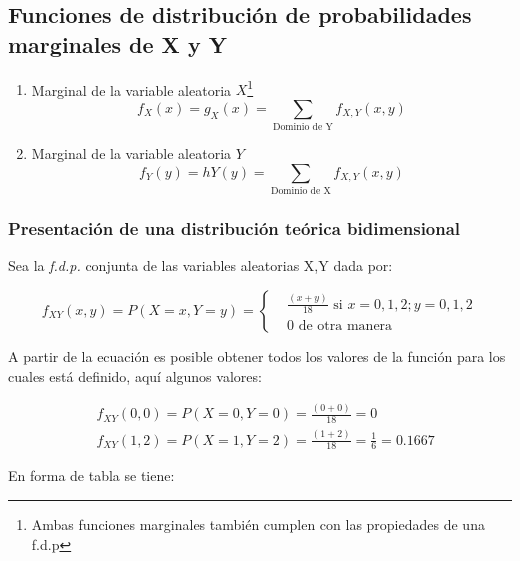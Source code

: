 \subsection{Funciones de distribución de probabilidades marginales de X y Y}

\begin{enumerate}
    \item Marginal de la variable aleatoria $X$\footnote{Ambas funciones marginales también cumplen con las propiedades de una f.d.p}
          \begin{equation}
              f_X\left(x\right) =g_X \left(x\right) = \sum_{\text{Dominio de Y}} f_{X ,Y} \left( x , y \right)
          \end{equation}
    \item Marginal de la variable aleatoria $Y$
          \begin{equation}
              f_Y\left(y\right)=hY\left(y\right)=\sum_{\text{Dominio de X}}f_{X,Y}
              \left(x,y\right)
          \end{equation}
\end{enumerate}

\subsubsection{Presentación de una distribución teórica bidimensional}

Sea la \textit{f.d.p.}  conjunta de las variables aleatorias X,Y dada por:

\begin{equation*}
    f_{XY}  \left(x,y\right) =P\left( X=x ,Y= y\right) =\begin{cases}
         & \frac{\left( x+ y \right) }{18}\text{ si }x=0,1,2;y=0,1,2 \\
         & 0\text{ de otra manera}
    \end{cases}
\end{equation*}

A partir de la ecuación es posible obtener todos los valores de
la función para los cuales está definido, aquí algunos valores:

\begin{align*}
    & f_{XY}\left( 0,0\right) =P\left( X=0 ,Y =0\right) =\frac{\left( 0+0\right)}{ 18}=0\\
    &f_{XY}\left( 1,2\right) =P\left(  X=1 ,Y =2 \right) =\frac{\left(1+2\right)}{18}=\frac{1}{6}=0.1667
\end{align*}


En forma de tabla se tiene:


